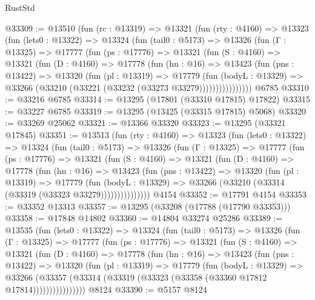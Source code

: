 \begin{lexlean}{RustStd}
\begin{coremodule}
@33309 := @13510
    (fun (rc : @13319) =>
    @13321
      (fun (rty : @4160) =>
      @13323
        (fun (lets0 : @13322) =>
        @13324
          (fun (tail0 : @5173) =>
          @13326
            (fun (Γ : @13325) =>
            @17777
              (fun (ps : @17776) =>
              @13321
                (fun (S : @4160) =>
                @13321
                  (fun (D : @4160) =>
                  @17778
                    (fun (hn : @16) =>
                    @13423
                      (fun (pns : @13422) =>
                      @13320
                        (fun (pl : @13319) =>
                        @17779
                          (fun (bodyL : @13329) =>
                          @33266 (@33210 (@33221 (@33232 (@33273 @33279))))))))))))))))
    @6785
@33310 := @33216 @6785
@33314 := @13295 (@17801 (@33310 @17815) @17822)
@33315 := @33227 @6785
@33319 := @13295 (@13425 (@33315 @17815) @5068)
@33320 := @33269 @25062
@33321 := @13366 @33320
@33323 := @13295 (@33321 @17845)
@33351 := @13513
    (fun (rty : @4160) =>
    @13323
      (fun (lets0 : @13322) =>
      @13324
        (fun (tail0 : @5173) =>
        @13326
          (fun (Γ : @13325) =>
          @17777
            (fun (ps : @17776) =>
            @13321
              (fun (S : @4160) =>
              @13321
                (fun (D : @4160) =>
                @17778
                  (fun (hn : @16) =>
                  @13423
                    (fun (pns : @13422) =>
                    @13320
                      (fun (pl : @13319) =>
                      @17779
                        (fun (bodyL : @13329) =>
                        @33266 (@33210 (@33314 (@33319 (@33323 @33279)))))))))))))))
    @4154
@33352 := @17791 @4154
@33353 := @33352 @13313
@33357 := @13295 (@33208 (@17788 (@17790 @33353)))
@33358 := @17848 @14802
@33360 := @14804 @33274 @25286
@33389 := @13535
    (fun (lets0 : @13322) =>
    @13324
      (fun (tail0 : @5173) =>
      @13326
        (fun (Γ : @13325) =>
        @17777
          (fun (ps : @17776) =>
          @13321
            (fun (S : @4160) =>
            @13321
              (fun (D : @4160) =>
              @17778
                (fun (hn : @16) =>
                @13423
                  (fun (pns : @13422) =>
                  @13320
                    (fun (pl : @13319) =>
                    @17779
                      (fun (bodyL : @13329) =>
                      @33266
                        (@33357
                          (@33314 (@33319 (@33323 (@33358 (@33360 @17812 @17814))))))))))))))))
    @8124
@33390 := @5157 @8124

\end{coremodule}
\end{lexlean}
